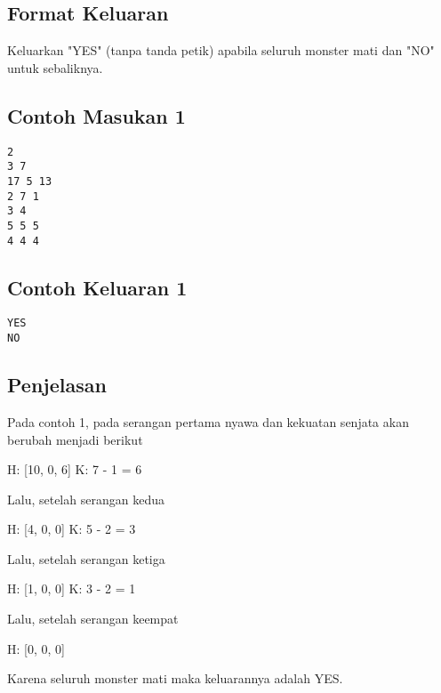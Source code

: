 \documentclass{article}
\begin{document}
\subsection*{Format Keluaran}

Keluarkan "YES" (tanpa tanda petik) apabila seluruh monster mati dan "NO" untuk sebaliknya.

\begin{multicols}{2}
\subsection*{Contoh Masukan 1}
\begin{lstlisting}
2
3 7
17 5 13
2 7 1
3 4
5 5 5
4 4 4
\end{lstlisting}
\columnbreak
\subsection*{Contoh Keluaran 1}
\begin{lstlisting}
YES
NO
\end{lstlisting}
\vfill
\null
\end{multicols}


\subsection*{Penjelasan}

Pada contoh 1, pada serangan pertama nyawa dan kekuatan senjata akan berubah menjadi berikut

H: [10, 0, 6]
K: 7 - 1 = 6

Lalu, setelah serangan kedua

H: [4, 0, 0]
K: 5 - 2 = 3

Lalu, setelah serangan ketiga

H: [1, 0, 0]
K: 3 - 2 = 1

Lalu, setelah serangan keempat

H: [0, 0, 0]

Karena seluruh monster mati maka keluarannya adalah YES.
\end{document}

